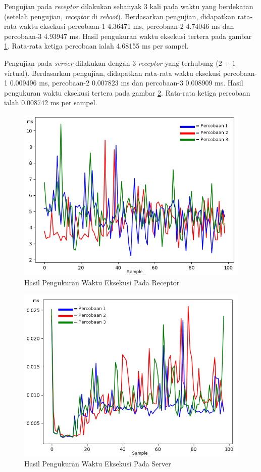 Pengujian pada \textit{receptor} dilakukan sebanyak 3 kali pada waktu yang berdekatan (setelah pengujian, \textit{receptor} di \textit{reboot}). Berdasarkan pengujian, didapatkan rata-rata waktu eksekusi percobaan-1 4.36471 ms, percobaan-2 4.74046 ms dan percobaan-3 4.93947 ms. Hasil pengukuran waktu eksekusi tertera pada gambar \ref{fig:exec_time}. Rata-rata ketiga percobaan ialah 4.68155 ms per sampel.

Pengujian pada \textit{server} dilakukan dengan 3 \textit{receptor} yang terhubung (2 + 1 virtual). Berdasarkan pengujian, didapatkan rata-rata waktu eksekusi percobaan-1 0.009496 ms, percobaan-2 0.007823 ms dan percobaan-3 0.008909 ms. Hasil pengukuran waktu eksekusi tertera pada gambar \ref{fig:exec_time2}. Rata-rata ketiga percobaan ialah 0.008742 ms per sampel.

\begin{figure}[H]
	\centering
	\includegraphics[scale=0.5]{images/exec_time1.png}
	\caption{Hasil Pengukuran Waktu Eksekusi Pada Receptor}
	\label{fig:exec_time}
\end{figure}

\begin{figure}[H]
	\centering
	\includegraphics[scale=0.5]{images/exec_time2.png}
	\caption{Hasil Pengukuran Waktu Eksekusi Pada Server}
	\label{fig:exec_time2}
\end{figure}

